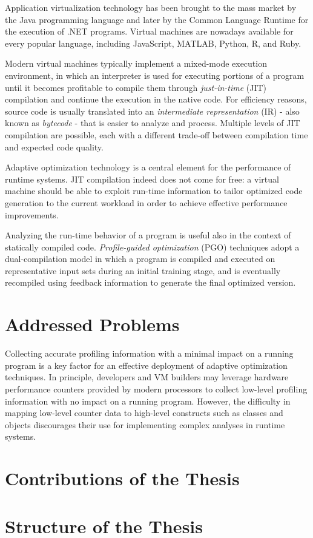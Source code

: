 Application virtualization technology has been brought to the mass market by the Java programming language and later by the Common Language Runtime for the execution of .NET programs. Virtual machines are nowadays available for every popular language, including JavaScript, MATLAB, Python, R, and Ruby.

Modern virtual machines typically implement a mixed-mode execution environment, in which an interpreter is used for executing portions of a program until it becomes profitable to compile them through {\em just-in-time} (JIT) compilation and continue the execution in the native code. For efficiency reasons, source code is usually translated into an {\em intermediate representation} (IR) - also known as {\em bytecode} - that is easier to analyze and process. Multiple levels of JIT compilation are possible, each with a different trade-off between compilation time and expected code quality.

Adaptive optimization technology is a central element for the performance of runtime systems. JIT compilation indeed does not come for free: a virtual machine should be able to exploit run-time information to tailor optimized code generation to the current workload in order to achieve effective performance improvements. 

Analyzing the run-time behavior of a program is useful also in the context of statically compiled code. {\em Profile-guided optimization} (PGO) techniques adopt a dual-compilation model in which a program is compiled and executed on representative input sets during an initial training stage, and is eventually recompiled using feedback information to generate the final optimized version.




\section{Addressed Problems}

Collecting accurate profiling information with a minimal impact on a running program is a key factor for an effective deployment of adaptive optimization techniques. In principle, developers and VM builders may leverage hardware performance counters provided by modern processors to collect low-level profiling information with no impact on a running program. However, the difficulty in mapping low-level counter data to high-level constructs such as classes and objects discourages their use for implementing complex analyses in runtime systems.

\section{Contributions of the Thesis}

\section{Structure of the Thesis}